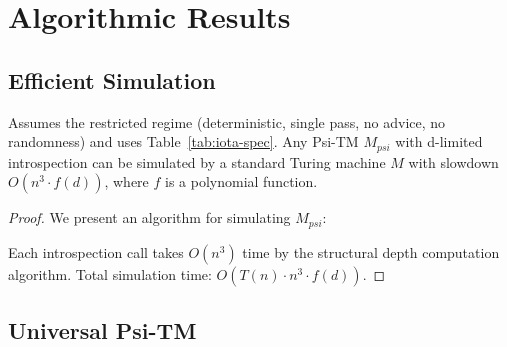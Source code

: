 \section{Algorithmic Results}

\subsection{Efficient Simulation}

\begin{theorem}
Assumes the restricted regime (deterministic, single pass, no advice, no randomness) and uses Table~\ref{tab:iota-spec}.
Any Psi-TM $M_{psi}$ with d-limited introspection can be simulated by a standard Turing machine $M$ with slowdown $O(n^3 \cdot f(d))$, where $f$ is a polynomial function.
\end{theorem}

\begin{proof}
We present an algorithm for simulating $M_{psi}$:

\begin{figure}[ht]
\end{figure}

Each introspection call takes $O(n^3)$ time by the structural depth computation algorithm. Total simulation time: $O(T(n) \cdot n^3 \cdot f(d))$.
\end{proof}

\subsection{Universal Psi-TM}

